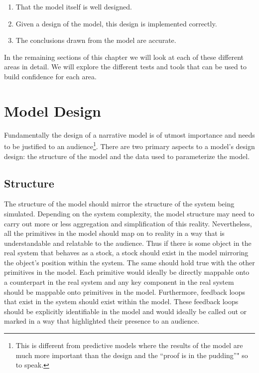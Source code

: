 \documentclass[]{memoir}
\begin{document}
\begin{enumerate}
\def\labelenumi{\arabic{enumi}.}
\itemsep1pt\parskip0pt
\item
  That the model itself is well designed.
\item
  Given a design of the model, this design is implemented correctly.
\item
  The conclusions drawn from the model are accurate.
\end{enumerate}

In the remaining sections of this chapter we will look at each of these
different areas in detail. We will explore the different tests and tools
that can be used to build confidence for each area.

\section{Model Design}

Fundamentally the design of a narrative model is of utmost importance
and needs to be justified to an audience\footnote{This is different from
  predictive models where the results of the model are much more
  important than the design and the ``proof is in the pudding''" so to
  speak.}. There are two primary aspects to a model's design design: the
structure of the model and the data used to parameterize the model.

\subsection{Structure}

The structure of the model should mirror the structure of the system
being simulated. Depending on the system complexity, the model structure
may need to carry out more or less aggregation and simplification of
this reality. Nevertheless, all the primitives in the model should map
on to reality in a way that is understandable and relatable to the
audience. Thus if there is some object in the real system that behaves
as a stock, a stock should exist in the model mirroring the object's
position within the system. The same should hold true with the other
primitives in the model. Each primitive would ideally be directly
mappable onto a counterpart in the real system and any key component in
the real system should be mappable onto primitives in the model.
Furthermore, feedback loops that exist in the system should exist within
the model. These feedback loops should be explicitly identifiable in the
model and would ideally be called out or marked in a way that
highlighted their presence to an audience.
\end{document}
